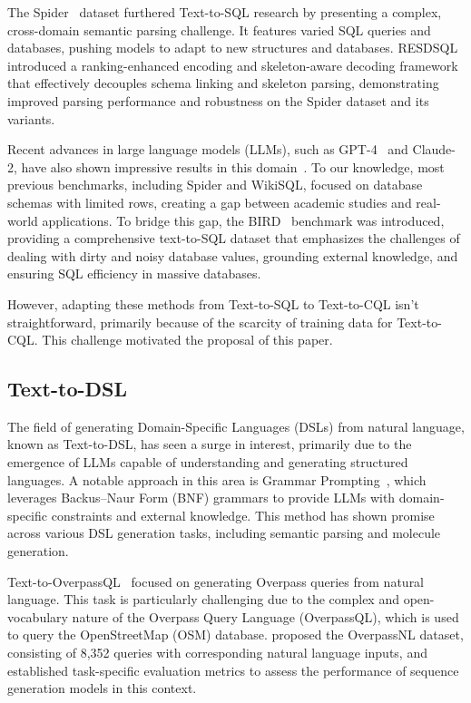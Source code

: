 \documentclass[11pt]{article}
\begin{document}
\begin{CJK*}{UTF8}{gbsn}
The Spider~\citep{yu-etal-2018-spider} dataset furthered Text-to-SQL research by presenting a complex, cross-domain semantic parsing challenge. 
It features varied SQL queries and databases, pushing models to adapt to new structures and databases. 
RESDSQL~\citep{li2023resdsql} introduced a ranking-enhanced encoding and skeleton-aware decoding framework that effectively decouples schema linking and skeleton parsing, demonstrating improved parsing performance and robustness on the Spider dataset and its variants.

Recent advances in large language models (LLMs), such as GPT-4~\citep{openai2023gpt4} and Claude-2, have also shown impressive results in this domain~\citep{gao2023texttosql, pourreza2023dinsql, dong2023c3}. 
To our knowledge, most previous benchmarks, including Spider and WikiSQL, focused on database schemas with limited rows, creating a gap between academic studies and real-world applications. 
To bridge this gap, the BIRD~\citep{li2023can} benchmark was introduced, providing a comprehensive text-to-SQL dataset that emphasizes the challenges of dealing with dirty and noisy database values, grounding external knowledge, and ensuring SQL efficiency in massive databases.

However, adapting these methods from Text-to-SQL to Text-to-CQL isn't straightforward, primarily because of the scarcity of training data for Text-to-CQL. 
This challenge motivated the proposal of this paper.

\subsection{Text-to-DSL}
\label{sec:text2dsl}

The field of generating Domain-Specific Languages (DSLs) from natural language, known as Text-to-DSL, has seen a surge in interest, primarily due to the emergence of LLMs capable of understanding and generating structured languages. 
A notable approach in this area is Grammar Prompting~\citep{wang2023grammar}, which leverages Backus–Naur Form (BNF) grammars to provide LLMs with domain-specific constraints and external knowledge. 
This method has shown promise across various DSL generation tasks, including semantic parsing and molecule generation.

Text-to-OverpassQL~\citep{staniek2023texttooverpassql} focused on generating Overpass queries from natural language. 
This task is particularly challenging due to the complex and open-vocabulary nature of the Overpass Query Language (OverpassQL), which is used to query the OpenStreetMap (OSM) database. 
\citet{staniek2023texttooverpassql} proposed the OverpassNL dataset, consisting of 8,352 queries with corresponding natural language inputs, and established task-specific evaluation metrics to assess the performance of sequence generation models in this context.


\end{CJK*}
\end{document}
